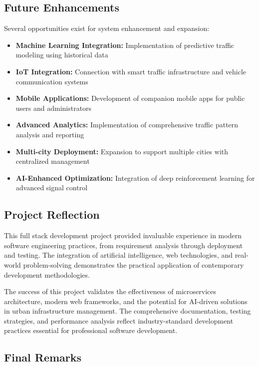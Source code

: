\documentclass[conference]{IEEEtran}
\begin{document}
\subsection{Future Enhancements}

Several opportunities exist for system enhancement and expansion:

\begin{itemize}
\item \textbf{Machine Learning Integration:} Implementation of predictive traffic modeling using historical data
\item \textbf{IoT Integration:} Connection with smart traffic infrastructure and vehicle communication systems
\item \textbf{Mobile Applications:} Development of companion mobile apps for public users and administrators
\item \textbf{Advanced Analytics:} Implementation of comprehensive traffic pattern analysis and reporting
\item \textbf{Multi-city Deployment:} Expansion to support multiple cities with centralized management
\item \textbf{AI-Enhanced Optimization:} Integration of deep reinforcement learning for advanced signal control
\end{itemize}

\subsection{Project Reflection}

This full stack development project provided invaluable experience in modern software engineering practices, from requirement analysis through deployment and testing. The integration of artificial intelligence, web technologies, and real-world problem-solving demonstrates the practical application of contemporary development methodologies.

The success of this project validates the effectiveness of microservices architecture, modern web frameworks, and the potential for AI-driven solutions in urban infrastructure management. The comprehensive documentation, testing strategies, and performance analysis reflect industry-standard development practices essential for professional software development.

\subsection{Final Remarks}
\end{document}
